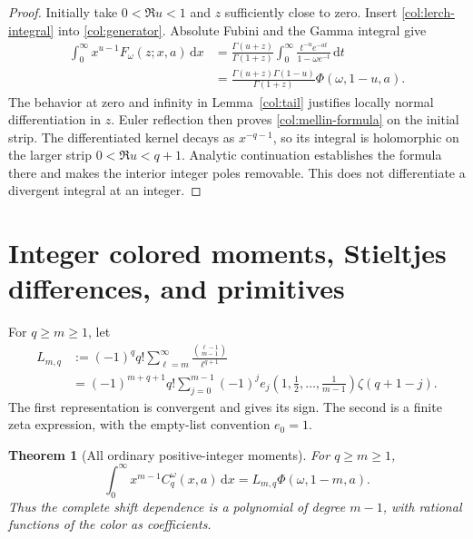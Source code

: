 \documentclass[11pt,a4paper]{article}
\numberwithin{equation}{section}
\newtheorem{theorem}{Theorem}[section]
\theoremstyle{definition}
\theoremstyle{remark}
\newcommand{\dd}{\,\mathrm d}
\begin{document}
\begin{proof}
Initially take $0<\Re u<1$ and $z$ sufficiently close to zero.
Insert \eqref{col:lerch-integral} into \eqref{col:generator}.
Absolute Fubini and the Gamma integral give
\begin{align*}
 \int_0^\infty x^{u-1}F_\omega(z;x,a)\dd x
 &=\frac{\Gamma(u+z)}{\Gamma(1+z)}
       \int_0^\infty\frac{t^{-u}e^{-at}}{1-\omega e^{-t}}\dd t\\
 &=\frac{\Gamma(u+z)\Gamma(1-u)}{\Gamma(1+z)}
                  \Phi(\omega,1-u,a).
\end{align*}
The behavior at zero and infinity in Lemma~\ref{col:tail}
justifies locally normal differentiation in $z$.
Euler reflection then proves \eqref{col:mellin-formula}
on the initial strip. The differentiated kernel decays as
$x^{-q-1}$, so its integral is holomorphic on the larger
strip $0<\Re u<q+1$. Analytic continuation establishes the
formula there and makes the interior integer poles removable.
This does not differentiate a divergent integral at an integer.
\end{proof}

\section{Integer colored moments, Stieltjes differences, and primitives}
\label{sec:colored-integer}

For $q\ge m\ge1$, let
\begin{align}
 L_{m,q}
 &:=(-1)^q q!\sum_{\ell=m}^\infty
              \frac{\binom{\ell-1}{m-1}}{\ell^{q+1}}
 \label{col:L-positive}\\
 &=(-1)^{m+q+1}q!
       \sum_{j=0}^{m-1}(-1)^j e_j(1,\tfrac12,\ldots,\tfrac1{m-1})
                         \zeta(q+1-j).\label{col:L-finite}
\end{align}
The first representation is convergent and gives its sign.
The second is a finite zeta expression, with the empty-list convention
$e_0=1$.

\begin{theorem}[All ordinary positive-integer moments]\label{col:integer}
For $q\ge m\ge1$,
\begin{equation}\label{col:integer-formula}
 \boxed{\displaystyle
 \int_0^\infty x^{m-1}C_q^\omega(x,a)\dd x
             =L_{m,q}\Phi(\omega,1-m,a).}
\end{equation}
Thus the complete shift dependence is a polynomial of degree
$m-1$, with rational functions of the color as coefficients.
\end{theorem}
\end{document}
